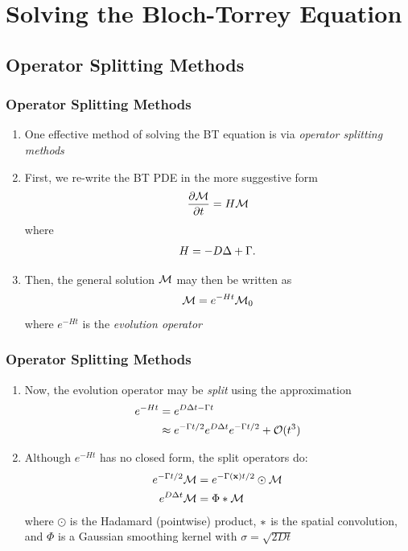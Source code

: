 \section{Solving the Bloch-Torrey Equation}


\subsection{Operator Splitting Methods}

\begin{frame}
\frametitle{Operator Splitting Methods}
\begin{enumerate}
    \item One effective method of solving the BT equation is via \textit{operator splitting methods}
    \item First, we re-write the BT PDE in the more suggestive form
    $$ \frac{\partial \mathcal{M}}{\partial t} = H \mathcal{M} $$
    where
    \begin{gather*}
        H = -D \mbox{$\Delta$}{} + \Gamma.
    \end{gather*}
    \item Then, the general solution $\mathcal{M}$ may then be written as
    $$ \mathcal{M} = e^{-Ht}\mathcal{M}_0 $$
    where $e^{-Ht}$ is the \textit{evolution operator}
\end{enumerate}
\end{frame}

\begin{frame}
\frametitle{Operator Splitting Methods}
\begin{enumerate}
    \item Now, the evolution operator may be \textit{split} using the approximation %
    \begin{align*}
        e^{-Ht} &= e^{D \Delta t - \Gamma t} \\
        &\approx e^{-\Gamma t/2} e^{D \Delta t} e^{-\Gamma t/2} + \mathcal{O}(t^3)
    \end{align*}
    \item Although $e^{-Ht}$ has no closed form, the split operators do:
    \begin{align*}
        e^{-\Gamma t/2} \mathcal{M} &= e^{-\Gamma(\mathbf{x}) t/2} \odot \mathcal{M} \\
        e^{D \Delta t} \mathcal{M} &= \Phi \ast \mathcal{M}
    \end{align*}
    where $\odot$ is the Hadamard (pointwise) product, $\ast$ is the spatial convolution, and $\Phi$ is a Gaussian smoothing kernel with $\sigma = \sqrt{2Dt}$
\end{enumerate}
\end{frame}

